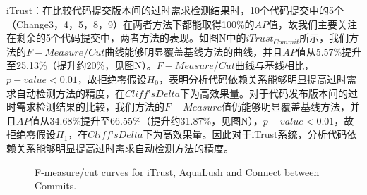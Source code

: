 iTrust：在比较代码提交版本间的过时需求检测结果时，10个代码提交中的5个（Change3，4，5，8，9）在两者方法下都能取得100\%的$AP$值，故我们主要关注在剩余的5个代码提交中，两者方法的表现。如图N中的$iTrust_{Commit}$所示，我们方法的$F-Measure/Cut$曲线能够明显覆盖基线方法的曲线，并且$AP$值从5.57\%提升至25.13\%（提升约20\%，见图N）。$F-Measure/Cut$曲线与基线相比，$p-value < 0.01$，故拒绝零假设$H_{0}$，表明分析代码依赖关系能够明显提高过时需求自动检测方法的精度，在$Cliff’s Delta$下为高效果量。对于代码发布版本间的过时需求检测结果的比较，我们方法的$F-Measure$值仍能够明显覆盖基线方法，并且$AP$值从34.68\%提升至66.55\%（提升约31.87\%，见图N），$p-value<0.01$，故拒绝零假设$H_{1}$，在$Cliff’s Delta$下为高效果量。因此对于iTrust系统，分析代码依赖关系能够明显提高过时需求自动检测方法的精度。

\begin{figure}[t]
   \caption{F-measure/cut curves for iTrust, AquaLush and Connect between Commits.}
   \label{fmeasure_commits}
\end{figure}


